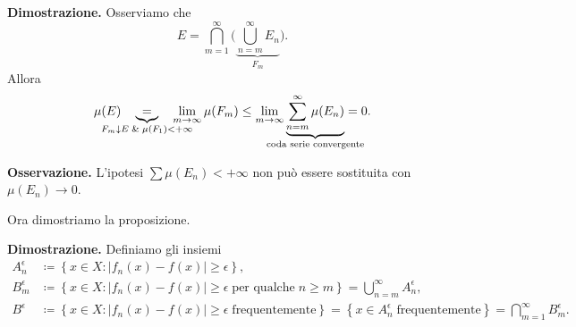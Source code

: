 \textbf{Dimostrazione.}
Osserviamo che
%
$$
	E = \bigcap_{m=1}^\infty \Big( \underbrace{\bigcup_{n=m}^\infty E_n}_{F_m} \Big).
$$
%
Allora
%
$$
	\mu(E) \quad \underbrace{=}_{\mathclap{F_m \downarrow E \; \& \; \mu(F_1) < +\infty}} \quad  \lim_{m \to \infty} \mu(F_m) \leq \lim_{m \to \infty} \underbrace{\sum_{n=m}^{\infty} \mu(E_n)}_{\mathclap{\text{coda serie convergente}}} = 0.
$$
%

\textbf{Osservazione.}
L'ipotesi $\sum \mu(E_n) < +\infty$ non può essere sostituita con $\mu(E_n) \to 0$.

Ora dimostriamo la proposizione.

\textbf{Dimostrazione.} Definiamo gli insiemi
\begin{align*}
A_n^\epsilon & \coloneqq \left\{ x \in X \colon \left| f_n(x) - f(x) \right| \geq \epsilon \right\}, \\
B_m^\epsilon & \coloneqq \left\{ x \in X \colon \left| f_n(x) - f(x) \right| \geq \epsilon \; \text{per qualche} \; n \geq m\right\} = \bigcup_{n = m}^\infty A_n^\epsilon, \\
B^\epsilon & \coloneqq \left\{ x \in X \colon \left| f_n(x) - f(x) \right| \geq \epsilon \; \text{frequentemente}  \right\} = \left\{ x \in A_n^\epsilon \; \text{frequentemente}  \right\} = \bigcap_{m = 1}^\infty B_m^\epsilon.
\end{align*}

